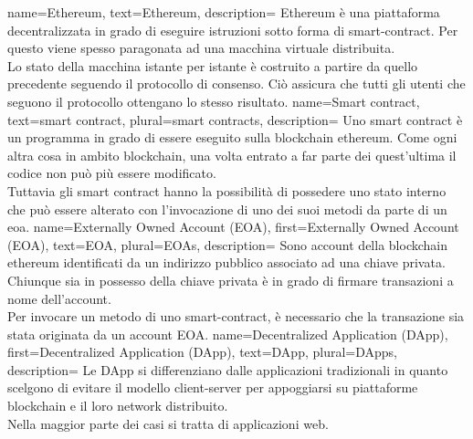 {
    name={Ethereum},
    text={Ethereum},
    description={
            Ethereum è una piattaforma decentralizzata in grado di eseguire istruzioni sotto forma
            di \gls{smart-contract}.
            Per questo viene spesso paragonata ad una macchina virtuale distribuita. \\
            Lo stato della macchina istante per istante è costruito a partire da quello
            precedente seguendo il protocollo di consenso.
            Ciò assicura che tutti gli utenti che seguono il protocollo ottengano lo stesso
            risultato.
        }
}
{
    name={Smart contract},
    text={smart contract},
    plural={smart contracts},
    description={
            Uno smart contract è un programma in grado di essere eseguito sulla blockchain \gls{ethereum}.
            Come ogni altra cosa in ambito blockchain, una volta entrato a far parte dei quest'ultima
            il codice non può più essere modificato. \\
            Tuttavia gli smart contract hanno la possibilità di possedere uno stato interno che può essere
            alterato con l'invocazione di uno dei suoi metodi da parte di un \gls{eoa}.
        }
}
{
    name={Externally Owned Account (EOA)},
    first={Externally Owned Account (EOA)},
    text={EOA},
    plural={EOAs},
    description={
            Sono account della blockchain \gls{ethereum} identificati da un indirizzo pubblico associato ad una chiave privata.
            Chiunque sia in possesso della chiave privata è in grado di firmare transazioni a nome dell'account. \\
            Per invocare un metodo di uno \gls{smart-contract}, è necessario che la transazione sia stata originata da un account EOA.
        }
}
{
    name={Decentralized Application (DApp)},
    first={Decentralized Application (DApp)},
    text={DApp},
    plural={DApps},
    description={
            Le DApp si differenziano dalle applicazioni tradizionali in quanto scelgono di evitare il modello client-server
            per appoggiarsi su piattaforme blockchain e il loro network distribuito. \\
            Nella maggior parte dei casi si tratta di applicazioni web.
        }
}

